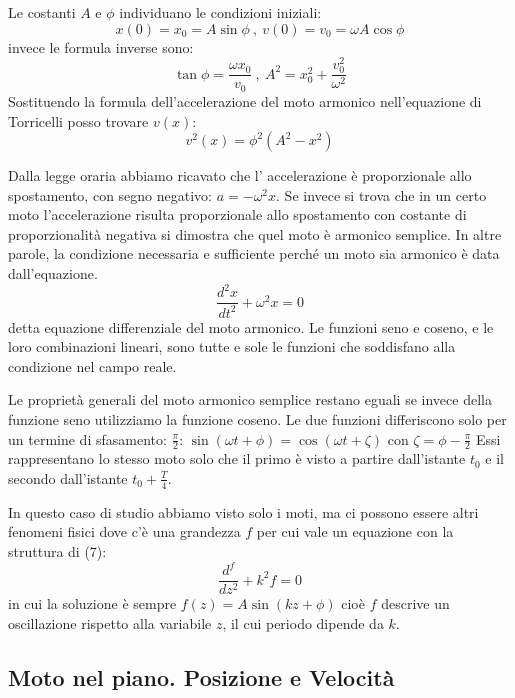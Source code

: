 \documentclass[class=book, crop=false, oneside, 12pt]{standalone}
\begin{document}
Le costanti \(A\) e \(\phi\) individuano le condizioni iniziali:
\begin{equation}
  x(0) = x_0 = A \sin \phi \ , \
  v(0) = v_0 = \omega A \cos \phi
\end{equation}
invece le formula inverse sono:
\begin{equation}
  \tan \phi = \frac{\omega x_0}{v_0} \ , \ 
  A^2 = x_0^2 + \frac {v_0^2}{\omega^2}
\end{equation}
Sostituendo la formula dell'accelerazione del moto armonico nell'equazione di Torricelli posso trovare \(v(x)\):
\begin{equation}
  v^2(x) = \phi^2 (A^2 - x^2) 
\end{equation}

Dalla legge oraria abbiamo ricavato che l' accelerazione è proporzionale allo spostamento, con segno negativo: \(a = - \omega^2 x\). Se invece si trova che in un certo moto l'accelerazione risulta proporzionale allo spostamento con costante di proporzionalità negativa si dimostra che quel moto è armonico semplice. 
In altre parole, la condizione necessaria e sufficiente perché un moto sia armonico è data dall'equazione.
\begin{equation}
  \frac{d^2 x}{dt^2} + \omega^2 x = 0
\end{equation}
detta equazione differenziale del moto armonico. Le funzioni seno e coseno, e le loro combinazioni lineari, sono tutte e sole le funzioni che soddisfano alla condizione nel campo reale. 

Le proprietà generali del moto armonico semplice restano eguali se invece della funzione seno utilizziamo la funzione coseno. 
Le due funzioni differiscono solo per un termine di sfasamento: \(\frac{\pi}{2}\): \(\sin(\omega t + \phi) = \cos(\omega t + \zeta)\) con \(\zeta = \phi - \frac{\pi}{2}\)
Essi rappresentano lo stesso moto solo che il primo è visto a partire dall'istante $t_0$ e il secondo dall'istante \(t_0 + \frac{T}{4}\).

In questo caso di studio abbiamo visto solo i moti, ma ci possono essere altri fenomeni fisici dove c'è una grandezza \(f\) per cui vale un equazione con la struttura di (7):
\begin{equation}
  \frac {d^f} { dz^2} + k^2 f = 0
\end{equation}
in cui la soluzione è sempre \(f(z) = A \sin(kz + \phi)\) cioè \(f\) descrive un oscillazione rispetto alla variabile \(z\), il cui periodo dipende da \(k\).

\subsection{Moto nel piano. Posizione e Velocità}
\end{document}
